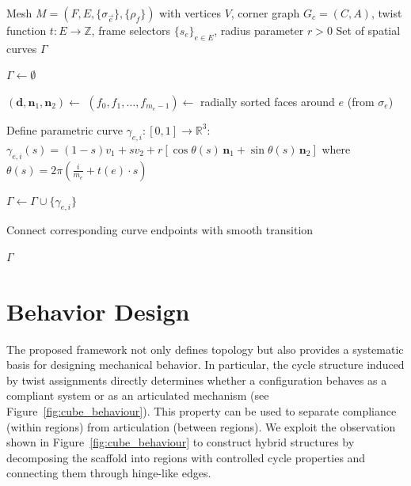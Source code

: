 \documentclass[acmtog,anonymous,review]{acmart}
\begin{document}
\begin{algorithm}[htb]
\caption{Geometric Realization with Combinatorial Frames}
\label{alg:geometric_realization}
\begin{algorithmic}[1]
\Require Mesh $M = (F, E, \{\sigma_{\vec{e}}\}, \{\rho_f\})$ with vertices $V$, corner graph $G_c = (C, A)$, twist function $t : E \to \mathbb{Z}$, frame selectors $\{s_e\}_{e \in E}$, radius parameter $r > 0$
\Ensure Set of spatial curves $\Gamma$

\State $\Gamma \gets \emptyset$

    \State $(\mathbf{d}, \mathbf{n}_1, \mathbf{n}_2) \gets$ 
    \State $(f_0, f_1, \dots, f_{m_e-1}) \gets$ radially sorted faces around $e$ (from $\sigma_e$)
    
        \State Define parametric curve $\gamma_{e,i} : [0,1] \to \mathbb{R}^3$:
        \Statex \hspace{2em}
        $\displaystyle
        \gamma_{e,i}(s) = (1-s)v_1 + s v_2 + r \left[\cos\theta(s) \, \mathbf{n}_1 + \sin\theta(s) \, \mathbf{n}_2\right]
        $
        \Statex \hspace{2em}
        where $\theta(s) = 2\pi\left(\frac{i}{m_e} + t(e) \cdot s\right)$
        
        \State $\Gamma \gets \Gamma \cup \{\gamma_{e,i}\}$
    \EndFor
\EndFor

    \State Connect corresponding curve endpoints with smooth transition
\EndFor

\State \Return $\Gamma$
\end{algorithmic}
\end{algorithm}



\section{Behavior Design}

The proposed framework not only defines topology but also provides a
systematic basis for designing mechanical behavior. In particular,
the cycle structure induced by twist assignments directly determines
whether a configuration behaves as a compliant system or as an
articulated mechanism (see Figure~\ref{fig:cube_behaviour}). This property can be used to separate compliance (within regions) from articulation (between regions). We exploit the observation shown in Figure~\ref{fig:cube_behaviour} to construct hybrid structures by decomposing the scaffold into regions with controlled cycle properties and connecting them through hinge-like edges.
\end{document}
